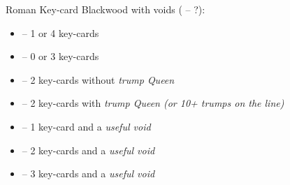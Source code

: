 Roman Key-card Blackwood with voids ( -- ?):
\begin{itemize}
  \item {} -- 1 or 4 key-cards
  \item {} -- 0 or 3 key-cards
  \item {} -- 2 key-cards without \emph{trump Queen}
  \item {} -- 2 key-cards with \emph{trump Queen (or 10+ trumps on the line)}
  \item {} -- 1 key-card and a \emph{useful void}
  \item {} -- 2 key-cards and a \emph{useful void}
  \item {} -- 3 key-cards and a \emph{useful void}
\end{itemize}
